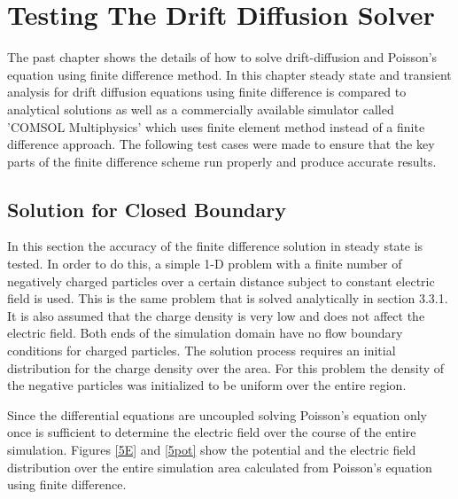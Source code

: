 
\chapter{Testing The Drift Diffusion Solver} %

\label{Chapter4} %


\begin{doublespace}

The past chapter shows the details of how to solve drift-diffusion and Poisson's equation using finite difference method. In this chapter steady state and transient analysis for drift diffusion equations using finite difference is compared to analytical solutions as well as a commercially available simulator called 'COMSOL Multiphysics' which uses finite element method instead of a finite difference approach. The following test cases were made to ensure that the key parts of the finite difference scheme run properly and produce accurate results. 

\section{Solution for Closed Boundary}
In this section the accuracy of the finite difference solution in steady state is tested. In order to do this, a simple 1-D problem with a finite number of negatively charged particles over a certain distance subject to constant electric field is used. This is the same problem that is solved analytically in section 3.3.1. It is also assumed that the charge density is very low and does not affect the electric field. Both ends of the simulation domain have no flow boundary conditions for charged particles. The solution process requires an initial distribution for the charge density over the area. For this problem the density of the negative particles was initialized to be uniform over the entire region. 

Since the differential equations are uncoupled solving Poisson's equation only once is sufficient to determine the electric field over the course of the entire simulation. Figures \ref{5E} and \ref{5pot} show the potential and the electric field distribution over the entire simulation area calculated from Poisson's equation using finite difference. 


\end{doublespace}
